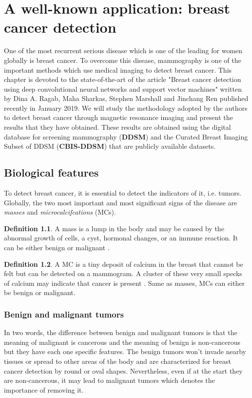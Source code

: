 \documentclass[11pt, openany]{report}
\theoremstyle{plain}
\theoremstyle{definition}
\newtheorem{defn}{Definition}[section]
\theoremstyle{remark}
\begin{document}
\chapter{A well-known application: breast cancer detection} \label{chap:breast-cancer}
One of the most recurrent serious disease which is one of the leading for women globally is breast cancer. To overcome this disease, mammography is one of the important methods which use medical imaging to detect breast cancer. This chapter is devoted to the state-of-the-art of the article "Breast cancer detection using deep convolutional neural networks and support vector machines" \cite{breast-cancer} written by Dina A. Ragab, Maha Sharkas, Stephen Marshall and Jinchang Ren published recently in January 2019. We will study the methodology adopted by the authors to detect breast cancer through magnetic resonance imaging and present the results that they have obtained. These results are obtained using the digital database for screening mammography (\textbf{DDSM}) and the Curated Breast Imaging Subset of DDSM (\textbf{CBIS-DDSM}) that are publicly available datasets.

\section{Biological features}
To detect breast cancer, it is essential to detect the indicators of it, i.e. tumors. Globally, the two most important and most significant signs of the disease are \textit{masses} and \textit{microcalcifcations} (MCs).  

\begin{defn}
A mass is a lump in the body and may be caused by the abnormal growth of cells, a cyst, hormonal changes, or an immune reaction. It can be either benign or malignant \cite{NCI}.
\end{defn}  

\begin{defn}
A MC is a tiny deposit of calcium in the breast that cannot be felt but can be detected on a mammogram. A cluster of these very small specks of calcium may indicate that cancer is present \cite{NCI}. Same as masses, MCs can either be benign or malignant.  
\end{defn}

\subsection{Benign and malignant tumors}
In two words, the difference between benign and malignant tumors is that the meaning of malignant is cancerous and the meaning of benign is non-cancerous but they have each one specific features. The benign tumors won't invade nearby tissues or spread to other areas of the body and are characterized for breast cancer detection by round or oval shapes. Nevertheless, even if at the start they are non-cancerous, it may lead to malignant tumors which denotes the importance of removing it. 
\end{document}
